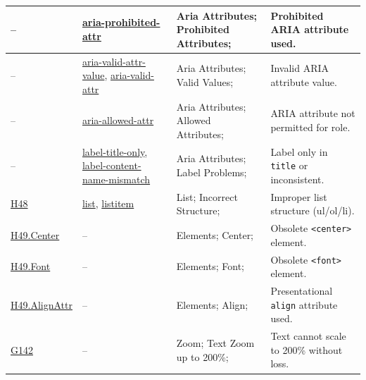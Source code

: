 \begin{table}[htbp]
\begin{tabularx}{\textwidth}{|L{2cm}|L{4.5cm}|L{3.5cm}|Y|}
-- &
\href{https://dequeuniversity.com/rules/axe/4.10/aria-prohibited-attr}{aria-prohibited-attr} &
Aria Attributes; Prohibited Attributes; &
Prohibited ARIA attribute used.\\ \hline


-- &
\href{https://dequeuniversity.com/rules/axe/4.10/aria-valid-attr-value}{aria-valid-attr-value},
\href{https://dequeuniversity.com/rules/axe/4.10/aria-valid-attr}{aria-valid-attr} &
Aria Attributes; Valid Values; &
Invalid ARIA attribute value.\\ \hline


-- &
\href{https://dequeuniversity.com/rules/axe/4.10/aria-allowed-attr}{aria-allowed-attr} &
Aria Attributes; Allowed Attributes; &
ARIA attribute not permitted for role.\\ \hline


-- &
\href{https://dequeuniversity.com/rules/axe/4.10/label-title-only}{label-title-only},
\href{https://dequeuniversity.com/rules/axe/4.10/label-content-name-mismatch}{label-content-name-mismatch} &
Aria Attributes; Label Problems; &
Label only in \texttt{title} or inconsistent.\\ \hline


\href{https://www.w3.org/TR/WCAG20-TECHS/H48.html}{H48} &
\href{https://dequeuniversity.com/rules/axe/4.10/list}{list},
\href{https://dequeuniversity.com/rules/axe/4.10/listitem}{listitem} &
List; Incorrect Structure; &
Improper list structure (ul/ol/li).\\ \hline


\href{https://www.w3.org/TR/WCAG20-TECHS/H49.html}{H49.Center} &
-- &
Elements; Center; &
Obsolete \texttt{<center>} element.\\ \hline


\href{https://www.w3.org/TR/WCAG20-TECHS/H49.html}{H49.Font} &
-- &
Elements; Font; &
Obsolete \texttt{<font>} element.\\ \hline


\href{https://www.w3.org/TR/WCAG20-TECHS/H49.html}{H49.AlignAttr} &
-- &
Elements; Align; &
Presentational \texttt{align} attribute used.\\ \hline


\href{https://www.w3.org/TR/WCAG20-TECHS/G142.html}{G142} &
-- &
Zoom; Text Zoom up to 200\%; &
Text cannot scale to 200\% without loss.\\ \hline


\end{tabularx}
\end{table}